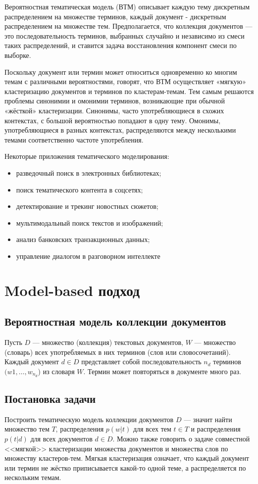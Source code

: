 \documentclass[article, 10pt]{disser}
\begin{document}
Вероятностная тематическая модель (ВТМ) описывает каждую тему дискретным распределением на множестве терминов, каждый документ - дискретным
распределением на множестве тем. Предполагается, что коллекция документов --- это последовательность терминов, выбранных случайно и независимо из смеси таких распределений, и ставится задача восстановления компонент смеси по выборке.

Поскольку документ или термин может относиться одновременно ко многим темам с различными вероятностями, говорят, что ВТМ осуществляет «мягкую» кластеризацию документов и терминов по кластерам-темам. Тем самым решаются проблемы синонимии и омонимии терминов, возникающие при обычной «жёсткой» кластеризации. Синонимы, часто употребляющиеся в схожих контекстах, с большой вероятностью попадают в одну тему. Омонимы, употребляющиеся в разных контекстах, распределяются между несколькими темами соответственно частоте употребления.

Некоторые приложения тематического моделирования:
\begin{itemize}
    \item разведочный поиск в электронных библиотеках;
    \item поиск тематического контента в соцсетях;
    \item детектирование и трекинг новостных сюжетов;
    \item мультимодальный поиск текстов и изображений;
    \item анализ банковских транзакционных данных;
    \item управление диалогом в разговорном интеллекте
\end{itemize}

\section{Model-based подход}
\subsection{Вероятностная модель коллекции документов}
Пусть $D$ --- множество (коллекция) текстовых документов, $W$ --- множество (словарь) всех употребляемых в них терминов (слов или словосочетаний). Каждый документ $d \in D$ представляет собой последовательность $n_d$ терминов $(w1, \dots, w_{n_d}$) из словаря $W$. Термин может повторяться в документе много раз.

\subsection{Постановка задачи}
Построить тематическую модель коллекции документов $D$ --- значит найти множество тем $T$, распределения $p(w |t)$ для всех тем $t \in T$ и распределения $p(t| d)$ для всех документов $d \in D$. Можно также говорить о задаче совместной <<мягкой>> кластеризации множества документов и множества слов по множеству кластеров-тем. Мягкая кластеризация означает, что каждый документ или термин не жёстко приписывается какой-то одной теме, а распределяется по нескольким темам.
\end{document}
